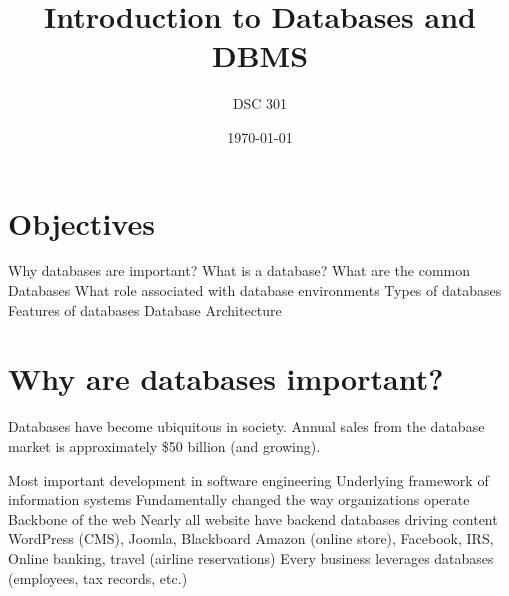 \documentclass{article}
\newtheorem{definition}{Definition}
\begin{document}
\title{Introduction to Databases and DBMS}
\author{DSC 301}
\date{\today}
\maketitle

 














\section*{Objectives}
\begin{outline}
     \1 Why databases are important?
     \1 What is a database?
     \1 What are the common Databases
     \1 What role associated with database environments
     \1 Types of databases  
     \1 Features of databases
     \1 Database Architecture  
\end{outline}














 \section{Why are databases important?}
  
Databases have become ubiquitous in society.  Annual sales from the database market is approximately \$50 billion (and growing).  

\begin{outline}
   \1 Most important development in software engineering
   \1 Underlying framework of information systems
   \1 Fundamentally changed the way organizations operate
   \1 Backbone of the web
        \2 Nearly all website have backend databases driving content
                \3 WordPress (CMS), Joomla, Blackboard
                \3 Amazon (online store), Facebook, IRS, 
                \3 Online banking, travel (airline reservations)       
   \1 Every business leverages databases (employees, tax records, etc.)
\end{outline}
\end{document}
